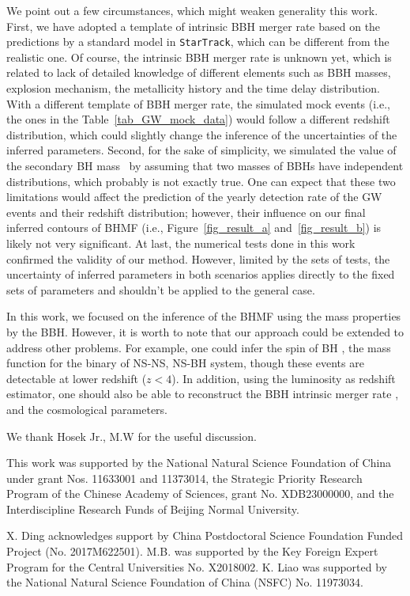 \documentclass[twocolumn]{aastex62}
\begin{document}
We point out a few circumstances, which might weaken generality this work. First, we have adopted a template of intrinsic BBH merger rate based on the predictions by a standard model in {\tt StarTrack}, which can be different from the realistic one. Of course, the intrinsic BBH merger rate is unknown yet, which is related to lack of detailed knowledge of different elements such as BBH masses, explosion mechanism, the metallicity history and the time delay distribution. With a different template of BBH merger rate, the simulated mock events (i.e., the ones in the Table~\ref{tab_GW_mock_data}) would follow a different redshift distribution, which could slightly change the inference of the uncertainties of the inferred parameters. Second, for the sake of simplicity, we simulated the value of the secondary BH mass \mtwo\ by assuming that two masses of BBHs have independent distributions, which probably is not exactly true. One can expect that these two limitations would affect the prediction of the yearly detection rate of the GW events and their redshift distribution; however, their influence on our final inferred contours of BHMF (i.e., Figure~\ref{fig_result_a} and~\ref{fig_result_b}) is likely not very significant.
At last, the numerical tests done in this work confirmed the validity of our method. However, limited by the sets of tests, the uncertainty of inferred parameters  in both scenarios applies directly to the fixed sets of parameters and shouldn't be applied to the general case.

In this work, we focused on the inference of the BHMF using the mass properties by the BBH. However, it is worth to note that our approach could be extended to address other problems. For example, one could infer the spin of BH \citep{Abbott2018b}, the mass function for the binary of NS-NS, NS-BH system, though these events are detectable at lower redshift ($z<4$). In addition, using the luminosity as redshift estimator, one should also be able to reconstruct the BBH intrinsic merger rate \citep{Fishbach2018}, and the cosmological parameters.


\acknowledgments
We thank Hosek Jr., M.W for the useful discussion.

This work was supported by the National Natural Science Foundation of China under grant Nos. 11633001 and 11373014, the Strategic Priority Research Program of the Chinese Academy of Sciences, grant No. XDB23000000, and the Interdiscipline Research Funds of Beijing Normal University.

X. Ding acknowledges support by China Postdoctoral Science Foundation Funded Project (No. 2017M622501).
M.B. was supported by the Key Foreign Expert Program for the Central Universities No. X2018002.
K. Liao was supported by the National Natural Science Foundation of China (NSFC) No. 11973034.
\end{document}
